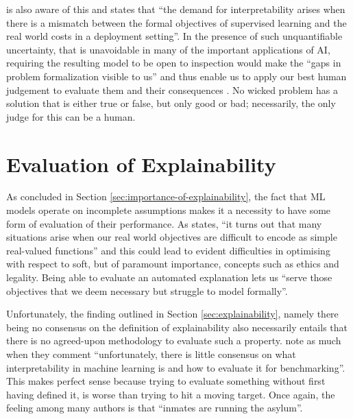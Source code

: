 \citet{Lipton2016} is also aware of this and states that \enquote{the demand for interpretability arises when there is a mismatch between the formal objectives of supervised learning and the real world costs in a deployment setting}.
In the presence of such unquantifiable uncertainty, that is unavoidable in many of the important applications of AI, requiring the resulting model to be open to inspection would make the \enquote{gaps in problem formalization visible to us} and thus enable us to apply our best human judgement to evaluate them and their consequences \citep{doshi2017towards}.
No wicked problem has a solution that is either true or false, but only good or bad; necessarily, the only judge for this can be a human.

\section{Evaluation of Explainability} \label{sec:evaluation-of-explainability}
As concluded in Section \ref{sec:importance-of-explainability}, the fact that ML models operate on incomplete assumptions makes it a necessity to have some form of evaluation of their performance.
As \citet{Lipton2016} states, \enquote{it turns out that many situations arise when our real world objectives are difficult to encode as simple real-valued functions} and this could lead to evident difficulties in optimising with respect to soft, but of paramount importance, concepts such as ethics and legality.
Being able to evaluate an automated explanation lets us \enquote{serve those objectives that we deem necessary but struggle to model formally}.

Unfortunately, the finding outlined in Section \ref{sec:explainability}, namely there being no consensus on the definition of explainability also necessarily entails that there is no agreed-upon methodology to evaluate such a property.
\citet{doshi2017towards} note as much when they comment \enquote{unfortunately, there is little consensus on what interpretability in machine learning is and how to evaluate it for benchmarking}.
This makes perfect sense because trying to evaluate something without first having defined it, is worse than trying to hit a moving target.
Once again, the feeling among many authors is that \enquote{inmates are running the asylum}.

